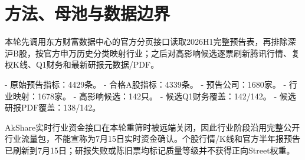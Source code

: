 \chapter{方法、母池与数据边界}

本轮先调用东方财富数据中心的官方分页接口读取2026H1完整预告表，再排除深沪B股，按官方申万历史分类映射行业；之后对高影响候选逐票刷新腾讯行情、复权K线、Q1财务和最新研报元数据/PDF。

- 原始预告指标：4429条。
- 合格A股指标：4339条。
- 预告公司：1680家。
- 行业映射：1678家。
- 高影响候选：142只。
- 候选Q1财务覆盖：142/142。
- 候选研报PDF覆盖：138/142。

\begin{riskbox}[数据边界]
AkShare实时行业资金接口在本轮重筛时被远端关闭，因此行业阶段沿用完整公开行业流量包，不能宣称为7月15日实时资金确认。个股行情/K线和官方半年报预告已刷新到7月15日；研报失败或陈旧票均标记质量等级并不获得正向Street权重。
\end{riskbox}
